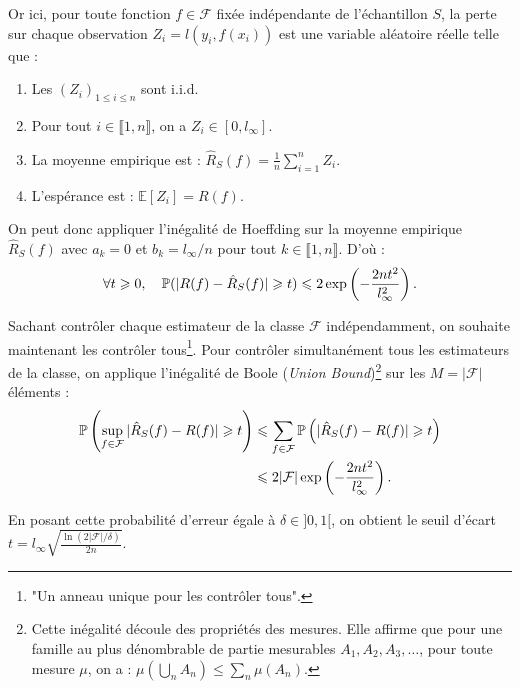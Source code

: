 \begin{proposition}
    Or ici, pour toute fonction $f \in \mathcal{F}$ fixée indépendante de l'échantillon $S$, la perte sur chaque observation $ Z_i = l(y_i, f(x_i))$ est une variable aléatoire réelle telle que : 
    \begin{enumerate}
        \item Les $(Z_i)_{1 \leqslant i \leqslant n}$ sont i.i.d. 
        \item Pour tout $ i \in \llbracket 1,n \rrbracket$, on a $ Z_i \in [0, l_\infty]$. 
        \item La moyenne empirique est : $ \hat{R}_S(f) = \frac{1}{n} \sum_{i=1}^{n} Z_i$. 
        \item L'espérance est : $ \mathbb{E}[Z_i] = R(f)$. 
    \end{enumerate}
    On peut donc appliquer l'inégalité de Hoeffding sur la moyenne empirique $ \hat{R}_S(f)$ avec $ a_k = 0$ et $ b_k = l_\infty / n$ pour tout $ k \in \llbracket 1, n \rrbracket$. D'où : 
    \begin{equation}
        \forall t \geqslant 0, \quad \mathbb{P}( |R(f) - \hat{R}_S(f) | \geqslant t) \leqslant 2 \exp \left(- \frac{2 n t^2}{l_\infty ^2}\right). 
    \end{equation}
\end{proposition}

Sachant contrôler chaque estimateur de la classe $ \mathcal{F}$ indépendamment, on souhaite maintenant les contrôler tous\footnote{"Un anneau unique pour les contrôler tous".}.
Pour contrôler simultanément tous les estimateurs de la classe, on applique l'inégalité de Boole (\emph{Union Bound})\footnote{Cette inégalité découle des propriétés des mesures. Elle affirme que pour une famille au plus dénombrable de partie mesurables $A_1, A_2, A_3, \dots$, pour toute mesure $ \mu$, on a : $ \mu \left( \bigcup_n A_n\right) \leqslant \sum_{n} \mu (A_n)$.} sur les $M = |\mathcal{F}|$ éléments :
\begin{align*}
    \mathbb{P}\left( \sup_{f \in \mathcal{F}} |\hat{R}_S(f) - R(f)| \geqslant t \right) 
    &\leqslant \sum_{f \in \mathcal{F}} \mathbb{P}\left( |\hat{R}_S(f) - R(f)| \geqslant t \right) \\
    &\leqslant 2 |\mathcal{F}| \exp\left( -\frac{2nt^2}{l_\infty^2} \right).
\end{align*}

En posant cette probabilité d'erreur égale à $\delta \in ]0, 1[$, on obtient le seuil d'écart $t = l_\infty \sqrt{\frac{\ln(2|\mathcal{F}|/\delta)}{2n}}$.

